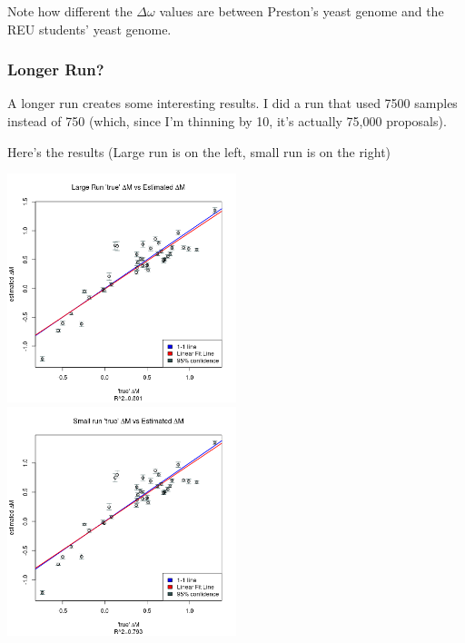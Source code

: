Note how different the $\Delta\omega$ values are between Preston's yeast genome and the REU students' yeast genome.



\subsubsection{Longer Run?}

A longer run creates some interesting results. I did a run that used 7500 samples instead of 750 (which, since I'm thinning by 10, it's actually 75,000 proposals).

Here's the results (Large run is on the left, small run is on the right)

\includegraphics[width=0.5\textwidth]{data/mu_largerun.png}
\includegraphics[width=0.5\textwidth]{data/mu_smallrun.png}

